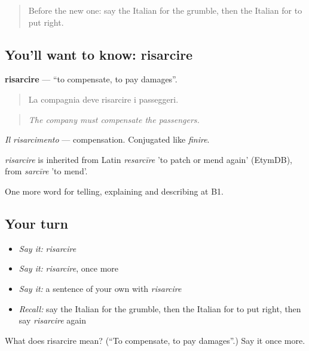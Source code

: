 \label{lesson:IT-C438-risarcire}



\begin{quote}
Before the new one: say the Italian for the grumble, then the Italian for to put right.
\end{quote}

\subsection*{You'll want to know: risarcire}
\textbf{risarcire} — \textquotedblleft{}to compensate, to pay damages\textquotedblright{}.

\begin{quote}
La compagnia deve risarcire i passeggeri.
\end{quote}

\begin{quote}
\emph{The company must compensate the passengers.}
\end{quote}

\emph{Il risarcimento} — compensation. Conjugated like \emph{finire}.

\begin{cousinweb}
\emph{risarcire} is inherited from Latin \emph{resarcīre} 'to patch or mend again' (EtymDB), from \emph{sarcīre} 'to mend'.
\end{cousinweb}

\begin{grammarlens}[title={What you've built}]
One more word for telling, explaining and describing at B1.
\end{grammarlens}

\subsection*{Your turn}
\begin{itemize}
\raggedright
  \item \emph{Say it:} \emph{risarcire}
  \item \emph{Say it:} \emph{risarcire}, once more
  \item \emph{Say it:} a sentence of your own with \emph{risarcire}
  \item \emph{Recall:} say the Italian for the grumble, then the Italian for to put right, then say \emph{risarcire} again
\end{itemize}

\begin{tcolorbox}[breakable,colback=teal!4,colframe=teal!35!black,title={Before you move on}]
What does risarcire mean? (\textquotedblleft{}To compensate, to pay damages\textquotedblright{}.) Say it once more.
\end{tcolorbox}
